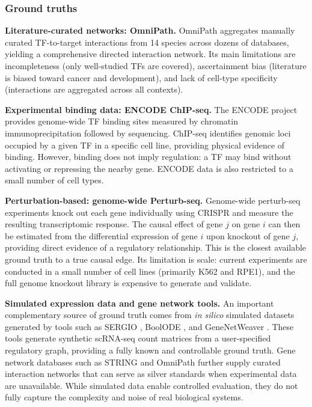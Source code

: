 \subsubsection{Ground truths}
\textbf{Literature-curated networks: OmniPath.} OmniPath \cite{tureiOmniPathGuidelinesGateway2016}
aggregates manually curated \gls{TF}-to-target interactions from 14 species across dozens of
databases, yielding a comprehensive directed interaction network. Its main limitations are
incompleteness (only well-studied \glspl{TF} are covered), ascertainment bias (literature is biased
toward cancer and development), and lack of cell-type specificity (interactions are aggregated
across all contexts).

\textbf{Experimental binding data: ENCODE \gls{ChIP-seq}.} The ENCODE project
\cite{theencodeprojectconsortiumIntegratedEncyclopediaDNA2012} provides genome-wide \gls{TF}
binding sites measured by chromatin immunoprecipitation followed by sequencing. ChIP-seq identifies
genomic loci occupied by a given \gls{TF} in a specific cell line, providing physical evidence of
binding. However, binding does not imply regulation: a \gls{TF} may bind without activating or
repressing the nearby gene. ENCODE data is also restricted to a small number of cell types.

\textbf{Perturbation-based: genome-wide Perturb-seq.} Genome-wide \gls{perturb-seq} experiments
\cite{replogleMappingInformationrichGenotypephenotype2022} knock out each gene individually using
\gls{CRISPR} and measure the resulting transcriptomic response. The causal effect of gene \(j\)
on gene \(i\) can then be estimated from the differential expression of gene \(i\) upon knockout
of gene \(j\), providing direct evidence of a regulatory relationship. This is the closest
available ground truth to a true causal edge. Its limitation is scale: current experiments are
conducted in a small number of cell lines (primarily K562 and RPE1), and the full genome knockout
library is expensive to generate and validate.

\textbf{Simulated expression data and gene network tools.} An important complementary source of
ground truth comes from \textit{in silico} simulated datasets generated by tools such as
SERGIO \cite{dibaeiniaSERGIOSingleCellExpression2020}, BoolODE
\cite{pratapaBenchmarkingAlgorithmsGene2020}, and GeneNetWeaver
\cite{schaffterGeneNetWeaverNetworkTopology2011}. These tools generate synthetic \gls{scRNA-seq}
count matrices from a user-specified regulatory graph, providing a fully known and controllable
ground truth. Gene network databases such as STRING and OmniPath further supply curated
interaction networks that can serve as silver standards when experimental data are unavailable.
While simulated data enable controlled evaluation, they do not fully capture the complexity and
noise of real biological systems.

